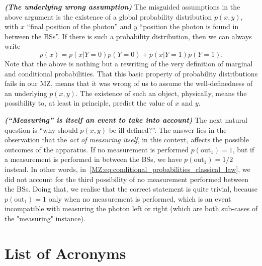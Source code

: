 \documentclass[a4paper]{report}
\newcommand{\heading}[1]{\textbf{\color{orange}\textit{(#1)}}}
\begin{document}
\heading{The underlying wrong assumption}
The misguided assumptions in the above argument is the existence of a global probability distribution $p(x,y)$, with $x$ ``final position of the photon'' and $y$ ``position the photon is found in between the BSs''.
If there is such a probability distribution, then we can always write
\begin{equation}
	p(x) = p(x|Y=0) p(Y=0) + p(x|Y=1) p(Y=1).
\end{equation}
Note that the above is nothing but a rewriting of the very definition of marginal and conditional probabilities.
That this basic property of probability distributions fails in our MZ, means that it was wrong of us to assume the well-definedness of an underlying $p(x,y)$.
The existence of such an object, physically, means the possibility to, at least in principle, predict the value of $x$ and $y$.

\heading{``Measuring'' is itself an event to take into account}
The next natural question is ``why should $p(x,y)$ be ill-defined?''.
The answer lies in the observation that the \emph{act of measuring itself}, in this context, affects the possible outcomes of the apparatus. If no measurement is performed $p(\text{out}_1)=1$, but if a measurement is performed in between the BSs, we have $p(\text{out}_1)=1/2$ instead.
In other words, in~\cref{MZ:eq:conditional_probabilities_classical_law}, we did not account for the third possibility of no measurement performed between the BSs.
Doing that, we realise that the correct statement is quite trivial, because $p(\text{out}_1)=1$ only when no measurement is performed, which is an event incompatible with measuring the photon left or right (which are both sub-cases of the "measuring" instance).




\printbibliography

\section*{List of Acronyms}
\begin{acronym}
\end{acronym}
\end{document}
